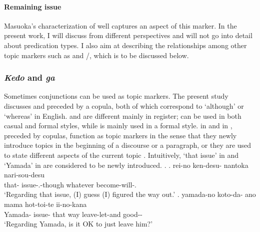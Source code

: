 


\paragraph{Remaining issue}

Masuoka's characterization of  well captures
an aspect of this marker.
In the present work, I will discuss  from different perspectives
and will not go into detail about predication types.
I also aim at describing the relationships among other topic markers
such as  and /,
which is to be discussed below.



\subsubsection{\textit{Kedo} and \textit{ga}}\label{BackSubSubKedo}

Sometimes conjunctions can be used as topic markers.
The present study discusses  and  preceded by a copula,
both of which correspond to `although' or `whereas' in English.
 and  are different mainly in register;
 can be used in both casual and formal styles,
while  is mainly used in a formal style.
 in \Next[a] and  in \Next[b],
preceded by copulas,
function as topic markers in the sense that
they newly introduce topics in the beginning of a discourse or a paragraph, or
they are used to state different aspects of the current topic
\cite{koide84,takahashi99}.
Intuitively,
`that issue' in \Next[a] and `Yamada' in \Next[b]
are considered to be newly introduced.
%
\ex.
 \ag. rei-no ken-desu- nantoka nari-sou-desu \\
      that- issue-.-though whatever become-will-. \\
      `Regarding that issue, (I) guess (I) figured the way out.'
 \bg. yamada-no koto-da- ano mama hot-toi-te ii-no-kana \\
      Yamada- issue- that way leave-let-and good-- \\
      `Regarding Yamada, is it OK to just leave him?'
      \hfill{\cite[283]{niwa06}}



